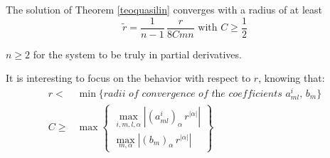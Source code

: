 \begin{theorem}\label{stimaraggio}
The solution of Theorem \ref{teoquasilin} converges with a radius of at least
$$\widetilde{r} = \dfrac{1}{n-1}\, \dfrac{r}{8Cmn} \text{ with } C \geq \frac{1}{2}$$
\end{theorem}
\begin{remark}
$n \geq 2$ for the system to be truly in partial derivatives. 
\end{remark}
\begin{remark}
It is interesting to focus on the behavior with respect to $r$, knowing that:
\begin{align}\label{r}
r <& \min \{ \textit{radii of convergence of the coefficients } a^i_{ml}, \, b_m\} \\ 
\label{C}
C \geq & \max \begin{Bmatrix}
\max\limits_{i,m,l,\alpha } \left| (a^i_{ml})_\alpha \, r^{|\alpha |}\right|\\
\max\limits_{m,\alpha} \left|(b_m)_\alpha \, r^{|\alpha |}\right|
\end{Bmatrix}
\end{align}
\end{remark}

